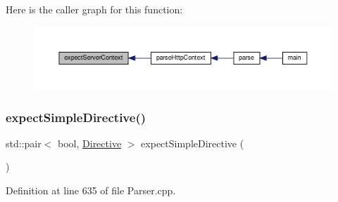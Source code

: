 Here is the caller graph for this function\+:
\nopagebreak
\begin{figure}[H]
\begin{center}
\leavevmode
\includegraphics[width=350pt]{classft_1_1_parser_a72f108d920a35284bf8f740bb8240acd_icgraph}
\end{center}
\end{figure}
\mbox{\label{classft_1_1_parser_a81d18b750d54e1e3002070531045171b}} 
\subsubsection{\texorpdfstring{expect\+Simple\+Directive()}{expectSimpleDirective()}}
{\footnotesize\ttfamily std\+::pair$<$ bool, \hyperlink{classft_1_1_directive}{Directive} $>$ expect\+Simple\+Directive (\begin{DoxyParamCaption}{ }\end{DoxyParamCaption})}



Definition at line 635 of file Parser.\+cpp.


